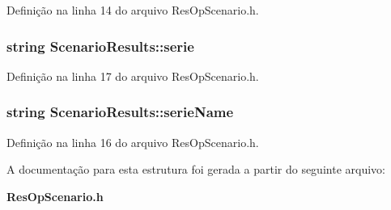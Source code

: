 Definição na linha 14 do arquivo Res\+Op\+Scenario.\+h.

\subsubsection[{serie}]{\setlength{\rightskip}{0pt plus 5cm}string Scenario\+Results\+::serie}\label{struct_scenario_results_a659b8c0e7d94e02cc23fb795abc0ff87}


Definição na linha 17 do arquivo Res\+Op\+Scenario.\+h.

\subsubsection[{serie\+Name}]{\setlength{\rightskip}{0pt plus 5cm}string Scenario\+Results\+::serie\+Name}\label{struct_scenario_results_af7eb31f1b0dec49ffa1407f12109fbeb}


Definição na linha 16 do arquivo Res\+Op\+Scenario.\+h.



A documentação para esta estrutura foi gerada a partir do seguinte arquivo\+:\begin{DoxyCompactItemize}
\item 
{\bf Res\+Op\+Scenario.\+h}\end{DoxyCompactItemize}
